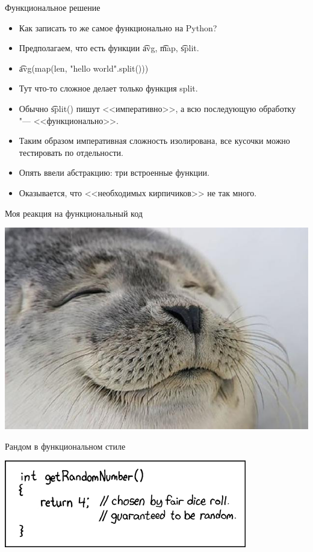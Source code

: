 \begin{frame}{Функциональное решение}
	\begin{itemize}
		\item Как записать то же самое функционально на Python? \pause
		\item Предполагаем, что есть функции \t{avg}, \t{map}, \t{split}. \pause
		\item \t{avg(map(len, "hello world".split()))} \pause
		\item Тут что-то сложное делает только функция split.
		\item Обычно \t{split()} пишут <<императивно>>, а всю последующую обработку "--- <<функционально>>.
		\item Таким образом императивная сложность изолирована, все кусочки можно тестировать по отдельности.
		\item Опять ввели абстракцию: три встроенные функции.
		\item Оказывается, что <<необходимых кирпичиков>> не так много.
	\end{itemize}
\end{frame}

\begin{frame}{Моя реакция на функциональный код}
	\begin{center}
		\includegraphics[scale=0.3]{satisfied-seal.jpg}
	\end{center}
\end{frame}

\begin{frame}{Рандом в функциональном стиле}
	\begin{center}
		\includegraphics[scale=0.3]{random_number.png}
	\end{center}
\end{frame}
